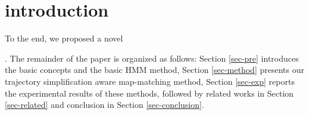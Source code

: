 

\section{introduction}
\label{sec-intro}


To the end, we proposed a novel 

.
The remainder of the paper is organized as follows:
Section \ref{sec-pre} introduces the basic concepts and the basic HMM method,
Section \ref{sec-method} presents our trajectory simplification aware map-matching method,
Section \ref{sec-exp} reports the experimental results of these methods, followed by related works in Section \ref{sec-related} and conclusion in Section \ref{sec-conclusion}.




